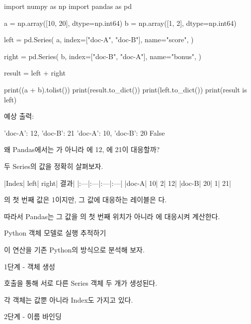 \begin{dhkcode}
import numpy as np
import pandas as pd

a = np.array([10, 20], dtype=np.int64)
b = np.array([1, 2], dtype=np.int64)

left = pd.Series(
    a,
    index=["doc-A", "doc-B"],
    name="score",
)

right = pd.Series(
    b,
    index=["doc-B", "doc-A"],
    name="bonus",
)

result = left + right

print((a + b).tolist())
print(result.to_dict())
print(left.to_dict())
print(result is left)
\end{dhkcode}

예상 출력:

\begin{dhkzsh}
[11, 22]
{'doc-A': 12, 'doc-B': 21}
{'doc-A': 10, 'doc-B': 20}
False
\end{dhkzsh}

왜 Pandas에서는 \zsh{[11, 22]}가 아니라 에 12, 에 21이 대응할까?

두 Series의 값을 정확히 살펴보자.

\begin{dhktable}
|Index|	left|	right|	결과|
|:---|:---|:---|:---|
|doc-A|	10|	2|	12|
|doc-B|	20|	1|	21|
\end{dhktable}

의 첫 번째 값은 1이지만, 그 값에 대응하는 레이블은 다.

따라서 Pandas는 그 값을 의 첫 번째 위치가 아니라 에 대응시켜 계산한다.

\begin{dhknote}
\begin{dhksmry}[centered]
Python 객체 모델로 실행 추적하기
\end{dhksmry}
\end{dhknote}

이 연산을 기존 Python의 방식으로 분석해 보자.

\begin{dhknote}
\begin{dhksmry}[centered]
1단계 - 객체 생성
\end{dhksmry}
\end{dhknote}

 호출을 통해 서로 다른 Series 객체 두 개가 생성된다.

각 객체는 값뿐 아니라 Index도 가지고 있다.

\begin{dhknote}
\begin{dhksmry}[centered]
2단계 - 이름 바인딩
\end{dhksmry}
\end{dhknote}

